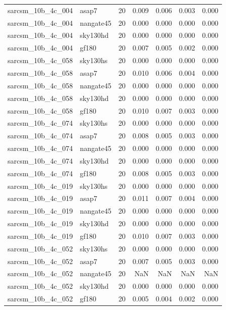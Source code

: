\begin{tabular}{llrrrrr}
sarcsm\_10b\_4c\_004 & asap7 & 20 & 0.009 & 0.006 & 0.003 & 0.000 \\
sarcsm\_10b\_4c\_004 & nangate45 & 20 & 0.000 & 0.000 & 0.000 & 0.000 \\
sarcsm\_10b\_4c\_004 & sky130hd & 20 & 0.000 & 0.000 & 0.000 & 0.000 \\
sarcsm\_10b\_4c\_004 & gf180 & 20 & 0.007 & 0.005 & 0.002 & 0.000 \\
sarcsm\_10b\_4c\_058 & sky130hs & 20 & 0.000 & 0.000 & 0.000 & 0.000 \\
sarcsm\_10b\_4c\_058 & asap7 & 20 & 0.010 & 0.006 & 0.004 & 0.000 \\
sarcsm\_10b\_4c\_058 & nangate45 & 20 & 0.000 & 0.000 & 0.000 & 0.000 \\
sarcsm\_10b\_4c\_058 & sky130hd & 20 & 0.000 & 0.000 & 0.000 & 0.000 \\
sarcsm\_10b\_4c\_058 & gf180 & 20 & 0.010 & 0.007 & 0.003 & 0.000 \\
sarcsm\_10b\_4c\_074 & sky130hs & 20 & 0.000 & 0.000 & 0.000 & 0.000 \\
sarcsm\_10b\_4c\_074 & asap7 & 20 & 0.008 & 0.005 & 0.003 & 0.000 \\
sarcsm\_10b\_4c\_074 & nangate45 & 20 & 0.000 & 0.000 & 0.000 & 0.000 \\
sarcsm\_10b\_4c\_074 & sky130hd & 20 & 0.000 & 0.000 & 0.000 & 0.000 \\
sarcsm\_10b\_4c\_074 & gf180 & 20 & 0.008 & 0.005 & 0.003 & 0.000 \\
sarcsm\_10b\_4c\_019 & sky130hs & 20 & 0.000 & 0.000 & 0.000 & 0.000 \\
sarcsm\_10b\_4c\_019 & asap7 & 20 & 0.011 & 0.007 & 0.004 & 0.000 \\
sarcsm\_10b\_4c\_019 & nangate45 & 20 & 0.000 & 0.000 & 0.000 & 0.000 \\
sarcsm\_10b\_4c\_019 & sky130hd & 20 & 0.000 & 0.000 & 0.000 & 0.000 \\
sarcsm\_10b\_4c\_019 & gf180 & 20 & 0.010 & 0.007 & 0.003 & 0.000 \\
sarcsm\_10b\_4c\_052 & sky130hs & 20 & 0.000 & 0.000 & 0.000 & 0.000 \\
sarcsm\_10b\_4c\_052 & asap7 & 20 & 0.007 & 0.005 & 0.003 & 0.000 \\
sarcsm\_10b\_4c\_052 & nangate45 & 20 & NaN & NaN & NaN & NaN \\
sarcsm\_10b\_4c\_052 & sky130hd & 20 & 0.000 & 0.000 & 0.000 & 0.000 \\
sarcsm\_10b\_4c\_052 & gf180 & 20 & 0.005 & 0.004 & 0.002 & 0.000 \\

\end{tabular}
